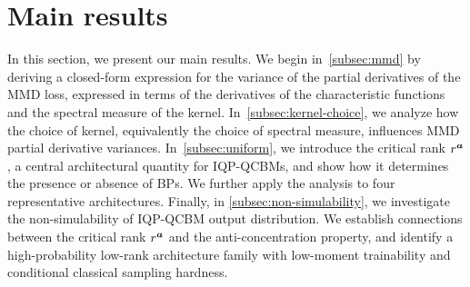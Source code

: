 \documentclass{article}
\theoremstyle{plain}
\theoremstyle{definition}
\theoremstyle{remark}
\begin{document}
\section{Main results} \label{sec:main-result}
In this section, we present our main results. We begin in~\cref{subsec:mmd} by deriving a closed-form expression for the variance of the partial derivatives of the MMD loss, expressed in terms of the derivatives of the characteristic functions and the spectral measure of the kernel.
In~\cref{subsec:kernel-choice}, we analyze how the choice of kernel, equivalently the choice of spectral measure, influences MMD partial derivative variances.
In~\cref{subsec:uniform}, we introduce the critical rank $r^{\bm{a}}$, a central architectural quantity for IQP-QCBMs, and show how it determines the presence or absence of BPs. We further apply the analysis to four representative architectures. 
Finally, in \cref{subsec:non-simulability}, we investigate the non-simulability of IQP-QCBM output distribution. 
We establish connections between the critical rank $r^{\bm{a}}$ and the anti-concentration property, and identify a high-probability low-rank architecture family with low-moment trainability and conditional classical sampling hardness.

\end{document}
